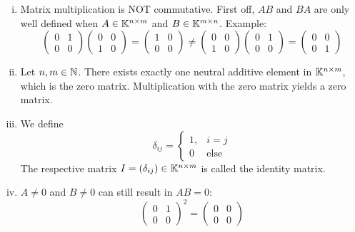 \documentclass[../../script.tex]{subfiles}
\begin{document}
\begin{rem}
\begin{enumerate}[(i)]
\begin{proof}[Proof of associativity]
		\begin{equation}
			\implies A(CE) = A(CE)
		\end{equation}
    \end{proof}

	\item Matrix multiplication is NOT commutative. First off, $AB$ and $BA$ are only well defined when $A \in \mathbb{K}^{n \times m}$ and $B \in \mathbb{K}^{m \times n}$. Example:
	\[
		\begin{pmatrix}
			0 & 1 \\ 0 & 0
		\end{pmatrix}
		\begin{pmatrix}
			0 & 0 \\ 1 & 0
		\end{pmatrix}
		=
		\begin{pmatrix}
			1 & 0 \\ 0 & 0
		\end{pmatrix}
		\neq
		\begin{pmatrix}
			0 & 0 \\ 1 & 0
		\end{pmatrix}
		\begin{pmatrix}
			0 & 1 \\ 0 & 0
		\end{pmatrix}
		=
		\begin{pmatrix}
			0 & 0 \\ 0 & 1
		\end{pmatrix}
	\]

	\item Let $n, m \in \mathbb{N}$. There exists exactly one neutral additive element in $\mathbb{K}^{n \times m}$, which is the zero matrix. 
	Multiplication with the zero matrix yields a zero matrix.

	\item We define
	\[
		\delta_{ij} = \begin{cases}
				1 ,& i = j \\
				0 &\text{else}
		\end{cases}
	\]
	The respective matrix $I = (\delta_{ij}) \in \mathbb{K}^{n \times m}$ is called the identity matrix.

	\item $A \ne 0$ and $B \ne 0$ can still result in $AB = 0$:
	\[
		\begin{pmatrix}
			0 & 1 \\ 0 & 0
		\end{pmatrix}^2
		=
		\begin{pmatrix}
			0 & 0 \\ 0 & 0
		\end{pmatrix}
	\]
\end{enumerate}
\end{rem}
\end{document}
